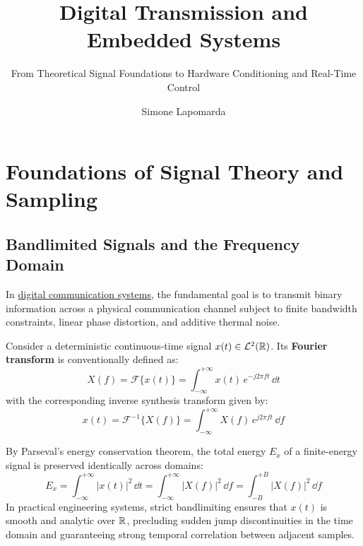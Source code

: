 \documentclass[
  lang=english,
  accent=0055A4,      %
  circuits=true,      %
  qed=smiley          %
]{opalith}
\title{Digital Transmission and Embedded Systems}
\subtitle{From Theoretical Signal Foundations to Hardware Conditioning and Real-Time Control}
\author{Simone Lapomarda}
\begin{document}
\maketitle
\tableofcontents

\chapter{Foundations of Signal Theory and Sampling}

\section{Bandlimited Signals and the Frequency Domain}
\label{sec:signals_frequencies}

In \uline{digital communication systems}, the fundamental goal is to transmit binary information across a physical communication channel subject to finite bandwidth constraints, linear phase distortion, and additive thermal noise.

Consider a deterministic continuous-time signal $x(t) \in \mathcal{L}^2(\RR)$. Its \textbf{Fourier transform} is conventionally defined as:
\begin{equation}
  X(f) = \mathcal{F}\{x(t)\} = \int_{-\infty}^{+\infty} x(t)\, e^{-j 2\pi f t}\, \dd t
  \label{eq:fourier_def}
\end{equation}
with the corresponding inverse synthesis transform given by:
\begin{equation}
  x(t) = \mathcal{F}^{-1}\{X(f)\} = \int_{-\infty}^{+\infty} X(f)\, e^{j 2\pi f t}\, \dd f
\end{equation}


By Parseval's energy conservation theorem, the total energy $E_x$ of a finite-energy signal is preserved identically across domains:
\begin{equation}
  E_x = \int_{-\infty}^{+\infty} |x(t)|^2 \, \dd t = \int_{-\infty}^{+\infty} |X(f)|^2 \, \dd f = \int_{-B}^{+B} |X(f)|^2 \, \dd f
\end{equation}
In practical engineering systems, strict bandlimiting ensures that $x(t)$ is smooth and analytic over $\RR$, precluding sudden jump discontinuities in the time domain and guaranteeing strong temporal correlation between adjacent samples.
\end{document}
